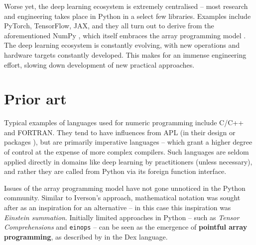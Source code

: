 Worse yet, the deep learning ecosystem is extremely centralised -- most research and engineering takes place in Python in a select few libraries. Examples include PyTorch, TensorFlow, JAX, and they all turn out to derive from the aforementioned NumPy \cite{frostig2018compiling, paszke2019pytorch, abadi2016tensorflow}, which itself embraces the array programming model \cite{harris2020array}. 
The deep learning ecosystem is constantly evolving, with new operations and hardware targets constantly developed. This makes for an immense engineering effort, slowing down development of new practical approaches.

\section{Prior art}

Typical examples of languages used for numeric programming include C/C++ and FORTRAN. 
They tend to have influences from APL (in their design \cite{bernecky1991fortran} or packages \cite{eigenweb}), but are primarily imperative languages -- which grant a higher degree of control at the expense of more complex compilers. 
Such languages are seldom applied directly in domains like deep learning by practitioners (unless necessary), and rather they are called from Python via its foreign function interface. 

Issues of the array programming model have not gone unnoticed in the Python community. Similar to Iverson's approach, mathematical notation was sought after as an inspiration for an alternative -- in this case this inspiration was \textit{Einstein summation}. Initially limited approaches in Python -- such as \textit{Tensor Comprehensions} \cite{vasilache2018tensor} and \texttt{einops} \cite{rogozhnikov2021einops} -- can be seen as the emergence of \textbf{pointful array programming}, as described by \textcite{paszke2021getting} in the Dex language. 

